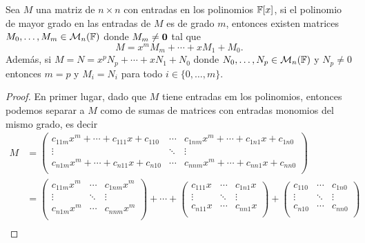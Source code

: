 \begin{lema} \label{lema:DescpminGrad}
  Sea $M$ una matriz de $n\times n$ con entradas en los polinomios $\mathbb{F}[x]$, si el polinomio de mayor grado en las entradas de $M$ es de grado $m$, entonces existen matrices $M_0, \ldots, M_m \in \mathcal{M}_n(\mathbb{F})$ donde $M_m \neq \mathbf{0}$ tal que
    \[M = x^m M_m + \cdots + x M_1  + M_0.\]
  Además, si $M = N = x^p N_p + \cdots + x N_1  + N_0$ donde $N_0, \ldots, N_p \in \mathcal{M}_n(\mathbb{F})$ y $N_p \neq 0$ entonces $m = p$ y $M_i = N_i$ para todo $i \in \{0,\ldots, m\}$. 
\end{lema}
\begin{proof}
  En primer lugar, dado que $M$ tiene entradas em los polinomios, entonces podemos separar a $M$ como de sumas de matrices con entradas monomios del mismo grado, es decir
    \begin{align*}
      M &= 
      \begin{pmatrix}
        c_{11m} x^m + \cdots + c_{111} x + c_{110}  & \cdots & c_{1nm} x^m + \cdots + c_{1n1} x + c_{1n0} \\
        \vdots & \ddots & \vdots \\
        c_{n1m} x^m + \cdots + c_{n11} x + c_{n10}  & \cdots & c_{nnm} x^m + \cdots + c_{nn1} x + c_{nn0}  \\
        \end{pmatrix} \\
      &= \begin{pmatrix}
        c_{11m} x^m  & \cdots & c_{1nm} x^m  \\
        \vdots & \ddots & \vdots \\
        c_{n1m} x^m  & \cdots & c_{nnm} x^m  \\
        \end{pmatrix} + 
        \cdots
        +\begin{pmatrix}
         c_{111} x & \cdots &  c_{1n1} x \\
        \vdots & \ddots & \vdots \\
         c_{n11} x  & \cdots &  c_{nn1} x \\
        \end{pmatrix}
        +\begin{pmatrix}
        c_{110} & \cdots &  c_{1n0}  \\
        \vdots & \ddots & \vdots \\
         c_{n10} & \cdots & c_{nn0}  \\
        \end{pmatrix} \\

\end{align*}
\end{proof}
